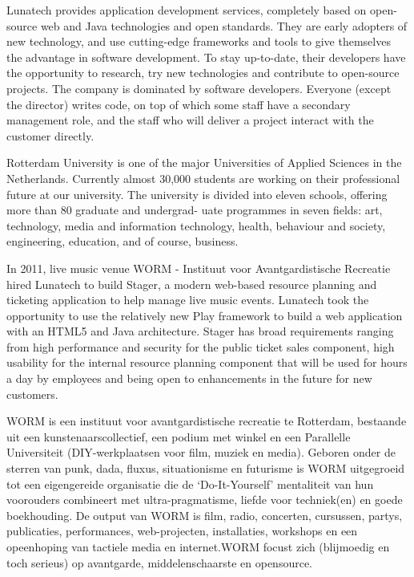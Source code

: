 Lunatech provides application development services, completely based on open-source web and Java technologies and open standards. They are early adopters of new technology, and use cutting-edge frameworks and tools to give themselves the advantage in software development. To stay up-to-date, their developers have the opportunity to research, try new technologies and contribute to open-source projects. The company is dominated by software developers. Everyone (except the director) writes code, on top of which some staff have a secondary management role, and the staff who will deliver a project interact with the customer directly.

Rotterdam University is one of the major Universities of Applied Sciences in the Netherlands. Currently almost 30,000 students are working on their professional future at our university.
The university is divided into eleven schools, offering more than 80 graduate and undergrad- uate programmes in seven fields: art, technology, media and information technology, health, behaviour and society, engineering, education, and of course, business.\cite{HogeschoolRotterdam2012}

In 2011, live music venue WORM - Instituut voor Avantgardistische Recreatie hired Lunatech to build Stager, a modern web-based resource planning and ticketing application to help manage live music events. Lunatech took the opportunity to use the relatively new Play framework to build a web application with an HTML5 and Java architecture. Stager has broad requirements ranging from high performance and security for the public ticket sales component, high usability for the internal resource planning component that will be used for hours a day by employees and being open to enhancements in the future for new customers.

WORM is een instituut voor avantgardistische recreatie te Rotterdam, bestaande uit een kunstenaarscollectief, een podium met winkel en een Parallelle Universiteit (DIY-werkplaatsen voor film, muziek en media). Geboren onder de sterren van punk, dada, fluxus, situationisme en futurisme is WORM uitgegroeid tot een eigengereide organisatie die de ‘Do-It-Yourself’ mentaliteit van hun voorouders combineert met ultra-pragmatisme, liefde voor techniek(en) en goede boekhouding. De output van WORM is film, radio, concerten, cursussen, partys, publicaties, performances, web-projecten, installaties, workshops en een opeenhoping van tactiele media en internet.WORM focust zich (blijmoedig en toch serieus) op avantgarde, middelenschaarste en opensource.

